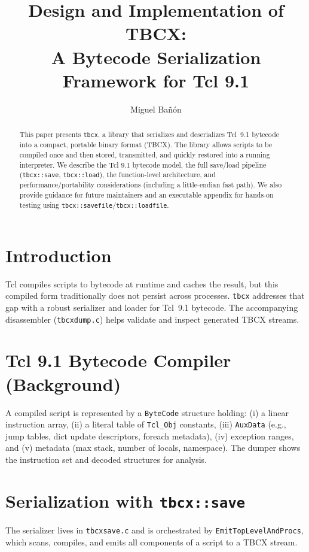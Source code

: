 \documentclass[11pt,a4paper]{article}
\title{\LARGE Design and Implementation of TBCX:\\ A Bytecode Serialization Framework for Tcl 9.1}
\author{\normalsize Miguel Bañón}
\date{}
\begin{document}
\maketitle

\begin{abstract}
\noindent
This paper presents \texttt{tbcx}, a library that serializes and deserializes Tcl~9.1 bytecode into a compact, portable binary format (TBCX). The library allows scripts to be compiled once and then stored, transmitted, and quickly restored into a running interpreter. We describe the Tcl 9.1 bytecode model, the full save/load pipeline (\texttt{tbcx::save}, \texttt{tbcx::load}), the function-level architecture, and performance/portability considerations (including a little-endian fast path). We also provide guidance for future maintainers and an executable appendix for hands-on testing using \texttt{tbcx::savefile}/\texttt{tbcx::loadfile}.
\end{abstract}

\section{Introduction}
Tcl compiles scripts to bytecode at runtime and caches the result, but this compiled form traditionally does not persist across processes. \texttt{tbcx} addresses that gap with a robust serializer and loader for Tcl~9.1 bytecode. The accompanying disassembler (\texttt{tbcxdump.c}) helps validate and inspect generated TBCX streams.

\section{Tcl 9.1 Bytecode Compiler (Background)}
A compiled script is represented by a \texttt{ByteCode} structure holding: (i) a linear instruction array, (ii) a literal table of \texttt{Tcl\_Obj} constants, (iii) \texttt{AuxData} (e.g., jump tables, dict update descriptors, foreach metadata), (iv) exception ranges, and (v) metadata (max stack, number of locals, namespace). The dumper shows the instruction set and decoded structures for analysis.

\section{Serialization with \texttt{tbcx::save}}
The serializer lives in \texttt{tbcxsave.c} and is orchestrated by \texttt{EmitTopLevelAndProcs}, which scans, compiles, and emits all components of a script to a TBCX stream.
\end{document}
